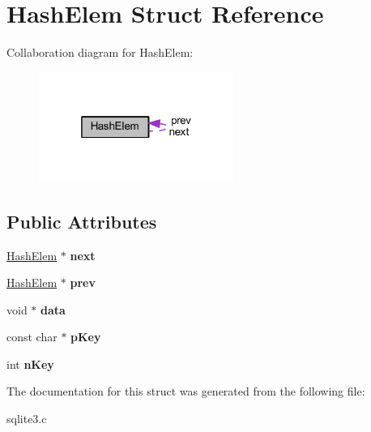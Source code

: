 \hypertarget{struct_hash_elem}{\section{Hash\-Elem Struct Reference}
\label{struct_hash_elem}
}


Collaboration diagram for Hash\-Elem\-:\nopagebreak
\begin{figure}[H]
\begin{center}
\leavevmode
\includegraphics[width=181pt]{struct_hash_elem__coll__graph}
\end{center}
\end{figure}
\subsection*{Public Attributes}
\begin{DoxyCompactItemize}
\item 
\hypertarget{struct_hash_elem_a2d28fad45ff21ffb8a02a7133df860fd}{\hyperlink{struct_hash_elem}{Hash\-Elem} $\ast$ {\bfseries next}}\label{struct_hash_elem_a2d28fad45ff21ffb8a02a7133df860fd}

\item 
\hypertarget{struct_hash_elem_ae4d011c0dc807a3c100ccdb927dd0ba9}{\hyperlink{struct_hash_elem}{Hash\-Elem} $\ast$ {\bfseries prev}}\label{struct_hash_elem_ae4d011c0dc807a3c100ccdb927dd0ba9}

\item 
\hypertarget{struct_hash_elem_ac7e80f63ba2f82457ff68aa0cd360365}{void $\ast$ {\bfseries data}}\label{struct_hash_elem_ac7e80f63ba2f82457ff68aa0cd360365}

\item 
\hypertarget{struct_hash_elem_a9c33a7c8ac467a5547a123338daf61f4}{const char $\ast$ {\bfseries p\-Key}}\label{struct_hash_elem_a9c33a7c8ac467a5547a123338daf61f4}

\item 
\hypertarget{struct_hash_elem_a12c1252e6aa2958f73e2ef969c9a3d81}{int {\bfseries n\-Key}}\label{struct_hash_elem_a12c1252e6aa2958f73e2ef969c9a3d81}

\end{DoxyCompactItemize}


The documentation for this struct was generated from the following file\-:\begin{DoxyCompactItemize}
\item 
sqlite3.\-c\end{DoxyCompactItemize}

